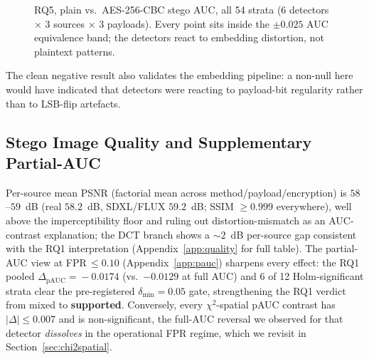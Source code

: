 \documentclass[10pt,twocolumn,a4paper]{article}
\begin{document}
\begin{figure}[t]
\caption{RQ5, plain vs.\ AES-256-CBC stego AUC, all 54 strata (6 detectors $\times$ 3 sources $\times$ 3 payloads). Every point sits inside the $\pm 0.025$ AUC equivalence band; the detectors react to embedding distortion, not plaintext patterns.}
\label{fig:rq5}
\end{figure}

The clean negative result also validates the embedding pipeline: a non-null here would have indicated that detectors were reacting to payload-bit regularity rather than to LSB-flip artefacts.

\subsection{Stego Image Quality and Supplementary Partial-AUC}
Per-source mean PSNR (factorial mean across method/payload/encryption) is $58$--$59$~dB (real $58.2$~dB, SDXL/FLUX $59.2$~dB; SSIM $\geq\!0.999$ everywhere), well above the imperceptibility floor and ruling out distortion-mismatch as an AUC-contrast explanation; the DCT branch shows a $\sim\!2$~dB per-source gap consistent with the RQ1 interpretation (Appendix~\ref{app:quality} for full table). The partial-AUC view at FPR\,$\leq\!0.10$ (Appendix~\ref{app:pauc}) sharpens every effect: the RQ1 pooled $\Delta_\text{pAUC}\!=\!-0.0174$ (vs.\ $-0.0129$ at full AUC) and 6 of 12 Holm-significant strata clear the pre-registered $\delta_\text{min}\!=\!0.05$ gate, strengthening the RQ1 verdict from mixed to \textbf{supported}. Conversely, every $\chi^2$-spatial pAUC contrast has $|\Delta|\!\leq\!0.007$ and is non-significant, the full-AUC reversal we observed for that detector \emph{dissolves} in the operational FPR regime, which we revisit in Section~\ref{sec:chi2spatial}.
\end{document}
